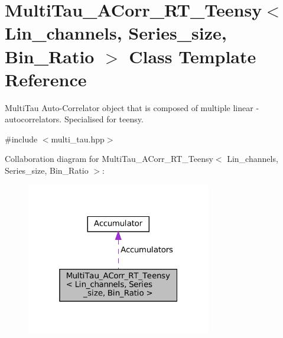 \hypertarget{classMultiTau__ACorr__RT__Teensy}{}\section{Multi\+Tau\+\_\+\+A\+Corr\+\_\+\+R\+T\+\_\+\+Teensy$<$ Lin\+\_\+channels, Series\+\_\+size, Bin\+\_\+\+Ratio $>$ Class Template Reference}
\label{classMultiTau__ACorr__RT__Teensy}


Multi\+Tau Auto-\/\+Correlator object that is composed of multiple linear -\/ autocorrelators. Specialised for teensy.  




{\ttfamily \#include $<$multi\+\_\+tau.\+hpp$>$}



Collaboration diagram for Multi\+Tau\+\_\+\+A\+Corr\+\_\+\+R\+T\+\_\+\+Teensy$<$ Lin\+\_\+channels, Series\+\_\+size, Bin\+\_\+\+Ratio $>$\+:\nopagebreak
\begin{figure}[H]
\begin{center}
\leavevmode
\includegraphics[width=229pt]{classMultiTau__ACorr__RT__Teensy__coll__graph}
\end{center}
\end{figure}
